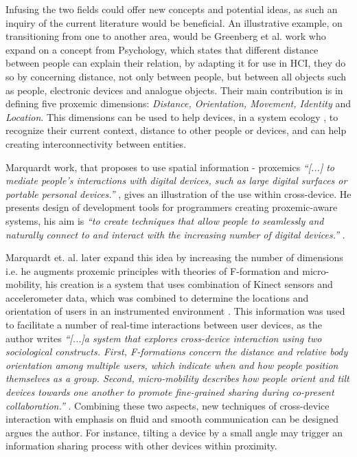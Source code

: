 Infusing the two fields could offer new concepts and potential ideas, as such an inquiry of the current literature would be beneficial. 
An illustrative example, on transitioning from one to another area, would be Greenberg et al. work \cite{Greenberg:2011} who expand on a concept from Psychology, which states that different distance between people can explain their relation, by adapting it for use in HCI, they do so by concerning distance, not only between people, but between all objects such as people, electronic devices and analogue objects. Their main contribution is in defining five proxemic dimensions: \emph{Distance, Orientation, Movement, Identity} and \emph{Location}. This dimensions can be used to help devices, in a system ecology , to recognize their current context, distance to other people or devices, and can help creating interconnectivity between entities. 

Marquardt work, that proposes to use spatial information - proxemics {\em``[...] to mediate people's interactions with digital devices, such as large digital surfaces or portable personal devices.''} \cite{Marquardt:2011}, gives an illustration of the use within cross-device. He presents design of development tools for programmers creating proxemic-aware systems, his aim is {\em``to create techniques that allow people to seamlessly and naturally connect to and interact with the increasing number of digital devices.''} \cite{Marquardt:2011}. 

Marquardt et. al.\cite{Marquardt:2012} later expand this idea by increasing the number of dimensions i.e. he augments proxemic principles with theories of F-formation and micro-mobility, his creation is a system that uses combination of Kinect sensors and accelerometer data, which was combined to determine the locations and orientation of users in an instrumented environment . This information was used to facilitate a number of real-time interactions between user devices, as the author writes {\em``[...]a system that explores cross-device interaction using two sociological constructs. First, F-formations concern the distance and relative body orientation among multiple users, which indicate when and how people position themselves as a group. Second, micro-mobility describes how people orient and tilt devices towards one another to promote fine-grained sharing during co-present collaboration.''} \cite{Marquardt:2012}. Combining these two aspects, new techniques of cross-device interaction with emphasis on fluid and smooth communication can be designed argues the author. For instance, tilting a device by a small angle may trigger an information sharing process with other devices within proximity.

